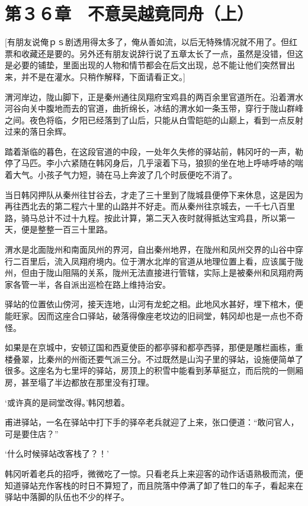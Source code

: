 \section{第３６章　不意吴越竟同舟（上）}

[有朋友说俺ｐｓ剧透用得太多了，俺从善如流，以后无特殊情况就不用了。但红票和收藏还是要的。另外还有朋友说辞行说了五章太长了一点，虽然是没错，但这是必要的铺垫，里面出现的人物和情节都会在后文出现，总不能让他们突然冒出来，并不是在灌水。只稍作解释，下面请看正文。]

渭河岸边，陇山脚下，正是秦州通往凤翔府宝鸡县的两百余里官道所在。沿着渭水河谷向关中腹地而去的官道，曲折绵长，冰结的渭水如一条玉带，穿行于陇山群峰之间。夜色将临，夕阳已经落到了山后，只能从白雪皑皑的山巅上，看到一点反射过来的落日余辉。

踏着渐临的暮色，在这段官道的中段，一处年久失修的驿站前，韩冈吁的一声，勒停了马匹。李小六紧随在韩冈身后，几乎滚着下马，狼狈的坐在地上呼哧呼哧的喘着大气。小孩子气力短，骑在马上奔波了几个时辰便吃不消了。

当日韩冈押队从秦州往甘谷去，才走了三十里到了陇城县便停下来休息，这是因为再往西北去的第二程六十里的山路并不好走。而从秦州往京城去，一千七八百里路，骑马总计不过十九程。按此计算，第二天入夜时就得抵达宝鸡县，所以第一天，便是整整一百三十里路。

渭水是北面陇州和南面凤州的界河，自出秦州地界，在陇州和凤州交界的山谷中穿行二百里后，流入凤翔府境内。位于渭水北岸的官道从地理位置上看，应该属于陇州，但由于陇山阻隔的关系，陇州无法直接进行管辖，实际上是被秦州和凤翔府两家各管一半，各自派出巡检在路上维持治安。

驿站的位置依山傍河，接天连地，山河有龙蛇之相。此地风水甚好，埋下棺木，便能旺家。因而这座合口驿站，破落得像座老坟边的旧祠堂，韩冈却也是一点也不奇怪。

如果是在京城中，安顿辽国和西夏使臣的都亭驿和都亭西驿，那便是雕栏画栋，重楼叠翠，比秦州的州衙还要气派三分。不过既然是山沟子里的驿站，设施便简单了很多。这座名为七里坪的驿站，房顶上的积雪中能看到茅草挺立，而后院的一侧厢房，甚至塌了半边都放在那里没有打理。

‘或许真的是祠堂改得。’韩冈想着。

甫进驿站，一名在驿站中打下手的驿卒老兵就迎了上来，张口便道：“敢问官人，可是要住店？”

‘什么时候驿站改客栈了？！’

韩冈听着老兵的招呼，微微吃了一惊。只看老兵上来迎客的动作话语熟极而流，便知道驿站充作客栈的时日不算短了，而且院落中停满了卸了牲口的车子，看起来在驿站中落脚的队伍也不少的样子。

